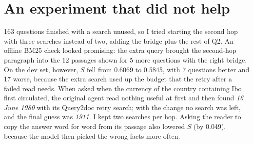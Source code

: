 \documentclass[10pt,a4paper]{article}
\begin{document}
\section{An experiment that did not help}
163 questions finished with a search unused, so I tried starting the second hop with three searches instead of two,
adding the bridge plus the rest of Q2. An offline BM25 check looked promising: the extra query brought the
second-hop paragraph into the 12 passages shown for 5 more questions with the right bridge. On the dev set, however,
$S$ fell from 0.6069 to 0.5845, with 7 questions better and 17 worse, because the extra search used up the budget
that the retry after a failed read needs. When asked when the currency of the country containing Ibo first
circulated, the original agent read nothing useful at first and then found \emph{16 June 1980} with its Query2doc
retry search; with the change no search was left, and the final guess was \emph{1911}. I kept two searches per hop. Asking the reader to copy the answer word for word from
its passage also lowered $S$ (by 0.049), because the model then picked the wrong facts more often.

\end{document}
